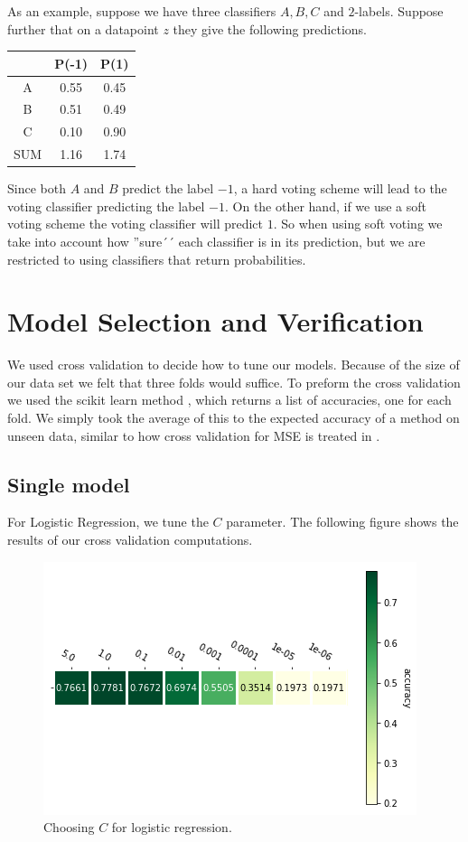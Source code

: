 \documentclass[parskip=half]{scrartcl}
\theoremstyle{definition}
\theoremstyle{remark}
\newcommand{\funcname}[1]{{\color{blue}{\texttt{#1}}}}
\begin{document}
As an example, suppose we have three classifiers $A,B,C$ and $2$-labels. 
Suppose further that on a datapoint $z$ they give the following predictions.

\begin{center}
\begin{tabular}{c|cc}
 & P(-1) & P(1) \\ 
\hline
\hline 
A & 0.55 & 0.45 \\ 
B & 0.51 & 0.49 \\ 
C & 0.10 & 0.90 \\ 
SUM & 1.16 & 1.74
\end{tabular} 
\end{center}

Since both $A$ and $B$ predict the label $-1$, a hard voting scheme will lead to the voting classifier predicting the label $-1$.
On the other hand, if we use a soft voting scheme the voting classifier will predict $1$.
So when using soft voting  we take into account how ''sure´´ each classifier is in its prediction, but we are restricted to using classifiers that return probabilities.  

\section{Model Selection and Verification}

We used cross validation to decide how to tune our models. 
Because of the size of our data set we felt that three folds would suffice.
To preform the cross validation we used the scikit learn method \funcname{cross\_val\_score}, which returns a list of accuracies, one for each fold. 
We simply took the average of this to the expected accuracy of a method on unseen data, similar to how cross validation for MSE is treated in \cite[Chapter 7.10]{htf:esl}.

\subsection{Single model}

For Logistic Regression, we tune the $C$ parameter. 
The following figure shows the results of our cross validation computations. 

\begin{figure}[H]
\caption{Choosing $C$ for logistic regression.}
\centering
\includegraphics[scale=0.6]{images/logistic_params.png}
\end{figure}
\end{document}
